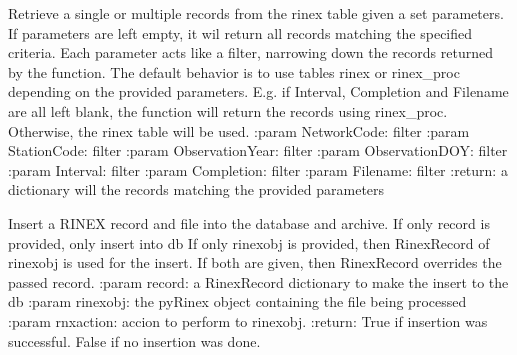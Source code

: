 \documentclass[letterpaper,10pt,english]{sphinxmanual}
\begin{document}
\begin{fulllineitems}
\begin{fulllineitems}
\label{\detokenize{classes:classes.pyArchiveStruct.RinexStruct.get_rinex_record}}
\pysigstartsignatures
{}
\pysigstopsignatures
\sphinxAtStartPar
Retrieve a single or multiple records from the rinex table given a set parameters. If parameters are left empty,
it wil return all records matching the specified criteria. Each parameter acts like a filter, narrowing down the
records returned by the function. The default behavior is to use tables rinex or rinex\_proc depending on the
provided parameters. E.g. if Interval, Completion and Filename are all left blank, the function will return the
records using rinex\_proc. Otherwise, the rinex table will be used.
:param NetworkCode: filter
:param StationCode: filter
:param ObservationYear: filter
:param ObservationDOY: filter
:param Interval: filter
:param Completion: filter
:param Filename: filter
:return: a dictionary will the records matching the provided parameters

\end{fulllineitems}


\begin{fulllineitems}
\label{\detokenize{classes:classes.pyArchiveStruct.RinexStruct.insert_rinex}}
\pysigstartsignatures
{}
\pysigstopsignatures
\sphinxAtStartPar
Insert a RINEX record and file into the database and archive. If only record is provided, only insert into db
If only rinexobj is provided, then RinexRecord of rinexobj is used for the insert. If both are given, then
RinexRecord overrides the passed record.
:param record: a RinexRecord dictionary to make the insert to the db
:param rinexobj: the pyRinex object containing the file being processed
:param rnxaction: accion to perform to rinexobj.
:return: True if insertion was successful. False if no insertion was done.

\end{fulllineitems}



\end{fulllineitems}
\end{document}
